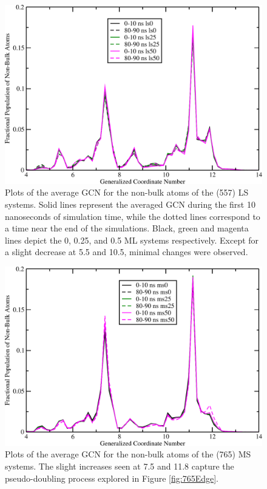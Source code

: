 \begin{figure}
\centering
\includegraphics[width=\linewidth]{../figures/appB/557ls_GCNF.pdf}
\caption{Plots of the average GCN for the non-bulk atoms of the  (557)
LS systems. Solid lines represent the averaged GCN during the first 10
nanoseconds of simulation time, while the dotted lines correspond to a time
near the end of the simulations. Black, green and magenta lines depict the 0,
0.25, and 0.5 ML systems respectively. Except for a slight decrease at 5.5 and
10.5, minimal changes were observed.}
\label{fig:557lsGCN}
\end{figure}
\newpage


\begin{figure}
\centering
\includegraphics[width=\linewidth]{../figures/appB/765ms_GCNF.pdf}
\caption{Plots of the average GCN for the non-bulk atoms of the  (765)
MS systems. The slight increases seen at 7.5 and 11.8 capture the
pseudo-doubling process explored in Figure \ref{fig:765Edge}.}
\label{fig:765msGCN}
\end{figure}
\newpage


